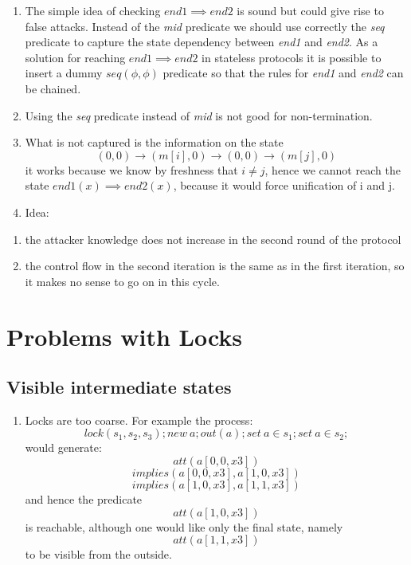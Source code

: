 \documentclass[11pt]{article}
\begin{document}
\begin{enumerate}
\item The simple idea of checking $end1 \implies end2$ is sound but
      could give rise to false attacks. Instead of the \emph{mid} predicate
      we should use correctly the \emph{seq} predicate to capture the state
      dependency between \emph{end1} and \emph{end2}. As a solution for reaching
      $end1 \implies end2$ in stateless protocols it is possible to
      insert a dummy $seq(\phi, \phi)$ predicate so that the rules for
      \emph{end1} and \emph{end2} can be chained.
\item Using the \emph{seq} predicate instead of \emph{mid} is not good for
      non-termination.
\item What is not captured is the information on the state
      $$ (0,0) \to (m[i],0) \to (0,0) \to (m[j],0) $$
      it works because we know by freshness that $i \neq j$, hence we 
      cannot reach the state $end1(x) \implies end2(x)$, because it would
      force unification of i and j.
\item Idea:
\end{enumerate}
   
\begin{enumerate}
\item the attacker knowledge does not increase in the second
         round of the protocol
\item the control flow in the second iteration is the same as in
         the first iteration, so it makes no sense to go on in this
         cycle.
\end{enumerate}
\section{Problems with Locks}
\label{sec-4}

\subsection{Visible intermediate states}
\label{sec-4.1}

\begin{enumerate}
\item Locks are too coarse. For example the process:
      \[lock(s_1,s_2,s_3); new\ a; out(a); set\ a \in s_1; set\ a \in s_2;\]
      would generate:
      \[att(a[0,0,x3])\]
      \[implies(a[0,0,x3], a[1,0,x3])\]
      \[implies(a[1,0,x3], a[1,1,x3])\]
      and hence the predicate
      \[att(a[1,0,x3])\]
      is reachable, although one would like only the final state, namely
      \[att(a[1,1,x3])\]
      to be visible from the outside.
\end{enumerate}
\end{document}
